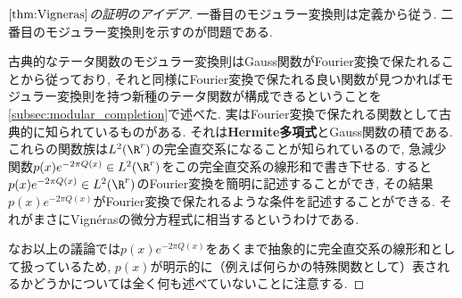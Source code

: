 \documentclass[11pt,b5paper,oneside,lualatex]{ltjsarticle} %
\numberwithin{equation}{section} %
\begin{document}
\begin{proof}[$ \cref{thm:Vigneras} $の証明のアイデア]
	一番目のモジュラー変換則は定義から従う. 
	二番目のモジュラー変換則を示すのが問題である. 
	
	古典的なテータ関数のモジュラー変換則はGauss関数がFourier変換で保たれることから従っており, それと同様にFourier変換で保たれる良い関数が見つかればモジュラー変換則を持つ新種のテータ関数が構成できるということを\cref{subsec:modular_completion}で述べた. 
	実はFourier変換で保たれる関数として古典的に知られているものがある. 
	それは\textbf{Hermite多項式}とGauss関数の積である. 
	これらの関数族は$ L^2(\R^r) $の完全直交系になることが知られているので, 急減少関数$ p(x) e^{-2\pi Q(x)} \in L^2(\R^r) $をこの完全直交系の線形和で書き下せる.
	すると$ p(x) e^{-2\pi Q(x)} \in L^2(\R^r) $のFourier変換を簡明に記述することができ, その結果$ p(x) e^{-2\pi Q(x)} $がFourier変換で保たれるような条件を記述することができる. 
	それがまさにVign\'{e}rasの微分方程式に相当するというわけである. 	
	
	なお以上の議論では$ p(x) e^{-2\pi Q(x)} $をあくまで抽象的に完全直交系の線形和として扱っているため, $ p(x) $が明示的に（例えば何らかの特殊関数として）表されるかどうかについては全く何も述べていないことに注意する.
\end{proof}













\end{document}
